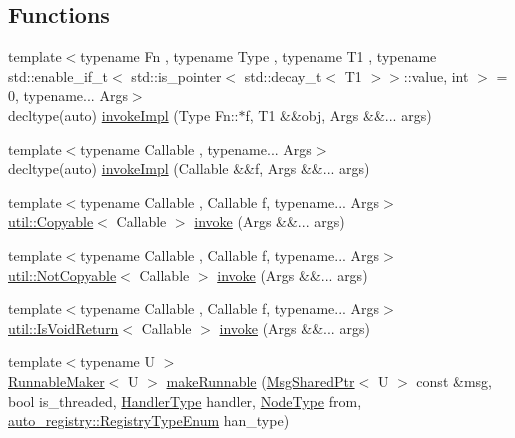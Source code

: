 \subsection*{Functions}
\begin{DoxyCompactItemize}
\item 
{\footnotesize template$<$typename Fn , typename Type , typename T1 , typename std\+::enable\+\_\+if\+\_\+t$<$ std\+::is\+\_\+pointer$<$ std\+::decay\+\_\+t$<$ T1 $>$$>$\+::value, int $>$  = 0, typename... Args$>$ }\\decltype(auto) \hyperlink{namespacevt_1_1runnable_a4253e4fa9c8c6e68da420ab440f2b298}{invoke\+Impl} (Type Fn\+::$\ast$f, T1 \&\&obj, Args \&\&... args)
\item 
{\footnotesize template$<$typename Callable , typename... Args$>$ }\\decltype(auto) \hyperlink{namespacevt_1_1runnable_af14b1c72fc3bf8437c2b89021af7eecf}{invoke\+Impl} (Callable \&\&f, Args \&\&... args)
\item 
{\footnotesize template$<$typename Callable , Callable f, typename... Args$>$ }\\\hyperlink{namespacevt_1_1util_ae9a553985cdc8e9bd4e55f55161f2929}{util\+::\+Copyable}$<$ Callable $>$ \hyperlink{namespacevt_1_1runnable_a14fa3dbf3bef4a683fc7284452b766d3}{invoke} (Args \&\&... args)
\item 
{\footnotesize template$<$typename Callable , Callable f, typename... Args$>$ }\\\hyperlink{namespacevt_1_1util_a0760a3963341a602dfe2dfc42d78c867}{util\+::\+Not\+Copyable}$<$ Callable $>$ \hyperlink{namespacevt_1_1runnable_aa86b7892ea9590c2e8fef9ed0ca4e80c}{invoke} (Args \&\&... args)
\item 
{\footnotesize template$<$typename Callable , Callable f, typename... Args$>$ }\\\hyperlink{namespacevt_1_1util_a97df3e28837417537b3bc035c74f064d}{util\+::\+Is\+Void\+Return}$<$ Callable $>$ \hyperlink{namespacevt_1_1runnable_ad7a4c11af0d8864939dca87f89fba1cb}{invoke} (Args \&\&... args)
\item 
{\footnotesize template$<$typename U $>$ }\\\hyperlink{structvt_1_1runnable_1_1_runnable_maker}{Runnable\+Maker}$<$ U $>$ \hyperlink{namespacevt_1_1runnable_a58e12568ad654ac603758ecffb9bf0dd}{make\+Runnable} (\hyperlink{namespacevt_ab2b3d506ec8e8d1540aede826d84a239}{Msg\+Shared\+Ptr}$<$ U $>$ const \&msg, bool is\+\_\+threaded, \hyperlink{namespacevt_af64846b57dfcaf104da3ef6967917573}{Handler\+Type} handler, \hyperlink{namespacevt_a866da9d0efc19c0a1ce79e9e492f47e2}{Node\+Type} from, \hyperlink{namespacevt_1_1auto__registry_a9f369ca2b484130b396729e2ddf05241}{auto\+\_\+registry\+::\+Registry\+Type\+Enum} han\+\_\+type)

\end{DoxyCompactItemize}
